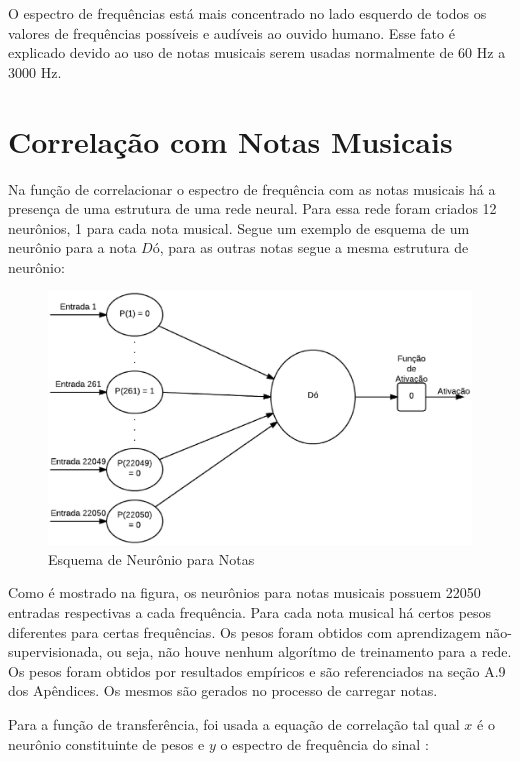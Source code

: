 O espectro de frequências está mais concentrado no lado esquerdo de todos os valores de frequências possíveis e audíveis ao ouvido humano. Esse fato é explicado devido ao uso de notas musicais serem usadas normalmente de 60 Hz a 3000 Hz. 

\newpage
\section{Correlação com Notas Musicais}
\label{sec:correlacaonotas}

Na função de correlacionar o espectro de frequência com as notas musicais há a presença de uma estrutura de uma rede neural. Para essa rede foram criados 12 neurônios, 1 para cada nota musical. Segue um exemplo de esquema de um neurônio para a nota $Dó$, para as outras notas segue a mesma estrutura de neurônio:

\begin{figure}[h]
	\centering
		\includegraphics[keepaspectratio=true,scale=0.41]{figuras/neuron_notes}
	\caption{Esquema de Neurônio para Notas}
\end{figure}

Como é mostrado na figura, os neurônios para notas musicais possuem 22050 entradas respectivas a cada frequência. Para cada nota musical há certos pesos diferentes para certas frequências. Os pesos foram obtidos com aprendizagem não-supervisionada, ou seja, não houve nenhum algorítmo de treinamento para a rede. Os pesos foram obtidos por resultados empíricos e são referenciados na seção A.9 dos Apêndices. Os mesmos são gerados no processo de carregar notas.

Para a função de transferência, foi usada a equação de correlação tal qual $x$ é o neurônio constituinte de pesos e $y$ o espectro de frequência do sinal \cite{correlacao}:


